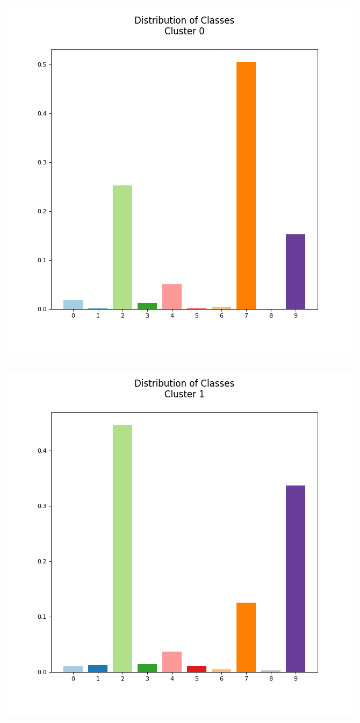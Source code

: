 \documentclass[12pt, a4paper]{article}
\begin{document}
\begin{figure}[h]
    \begin{subfigure}{0.3\linewidth}
        \centering
        \includegraphics[scale=0.15]{images/q4/g/cluster0.png}
    \end{subfigure}
    \hfill
    \begin{subfigure}{0.3\linewidth}
        \centering
        \includegraphics[scale=0.15]{images/q4/g/cluster1.png}

\end{subfigure}
\end{figure}
\end{document}
